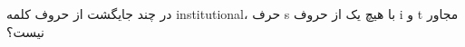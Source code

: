 \p    
در چند جایگشت از حروف کلمه
{\large institutional}،
 حرف s با هیچ یک از حروف i و t مجاور نیست؟
